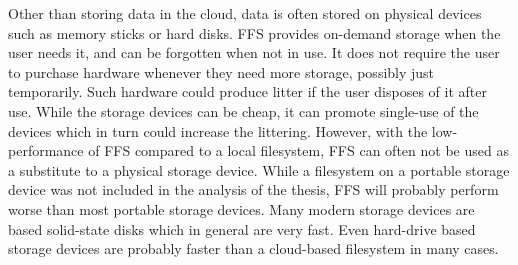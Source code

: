 Other than storing data in the cloud, data is often stored on physical devices such as memory sticks or hard disks. \gls{FFS} provides \mbox{on-demand} storage when the user needs it, and can be forgotten when not in use. It does not require the user to purchase hardware whenever they need more storage, possibly just temporarily. Such hardware could produce litter if the user disposes of it after use. While the storage devices can be cheap, it can promote \mbox{single-use} of the devices which in turn could increase the littering. However, with the low-performance of \gls{FFS} compared to a local filesystem, \gls{FFS} can often not be used as a substitute to a physical storage device. While a filesystem on a portable storage device was not included in the analysis of the thesis, \gls{FFS} will probably perform worse than most portable storage devices. Many modern storage devices are based solid-state disks which in general are very fast. Even hard-drive based storage devices are probably faster than a \mbox{cloud-based} filesystem in many cases.

